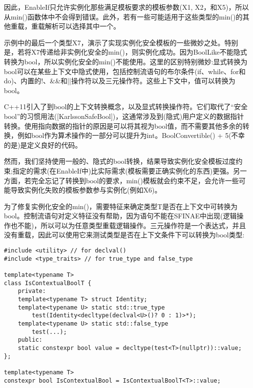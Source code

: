 因此，EnableIf只允许实例化那些满足模板要求的模板参数(X1, X2，和X5)，所以从min()函数体中不会得到错误。此外，若有一些可能适用于这些类型的min()的其他重载，重载解析可以选择其中一个。

示例中的最后一个类型X7，演示了实现实例化安全模板的一些微妙之处。特别是，若将X7传递给非实例化安全的min()，则实例化成功。因为BoolLike不能隐式转换为bool，所以实例化安全的min()不能使用。这里的区别特别微妙:显式转换为bool可以在某些上下文中隐式使用，包括控制流语句的布尔条件(if、while、for和do)、内置的!、\&\&和||操作符以及三元操作符。这些上下文中，值可以转换为bool。

\begin{tcolorbox}[colback=webgreen!5!white,colframe=webgreen!75!black]
\hspace*{0.75cm}C++11引入了到bool的上下文转换概念，以及显式转换操作符。它们取代了“安全bool”的习惯用法([KarlssonSafeBool])，这通常涉及到(隐式)用户定义的数据指针转换。使用指向数据的指针的原因是可以将其视为bool值，而不需要其他多余的转换，例如bool作为算术操作的一部分可以提升为int。BoolConvertible() + 5(不幸的是)是定义良好的代码。
\end{tcolorbox}

然而，我们坚持使用一般的、隐式的bool转换，结果导致实例化安全模板过度约束;指定的需求(在EnableIf中)比实际需求(模板需要正确实例化的东西)更强。另一方面，若完全忘记了转换到bool的要求，min()模板就会约束不足，会允许一些可能导致实例化失败的模板参数参与实例化(例如X6)。

为了修复实例化安全的min()，需要特征来确定类型T是否在上下文中可转换为bool。控制流语句对定义特征没有帮助，因为语句不能在SFINAE中出现(逻辑操作也不能)，所以可以为任意类型重载逻辑操作。三元操作符是一个表达式，并且没有重载，因此可以使用它来测试类型是否在上下文条件下可以转换为bool类型:

\begin{lstlisting}[style=styleCXX]
#include <utility> // for declval()
#include <type_traits> // for true_type and false_type

template<typename T>
class IsContextualBoolT {
	private:
	template<typename T> struct Identity;
	template<typename U> static std::true_type
		test(Identity<decltype(declval<U>()? 0 : 1)>*);
	template<typename U> static std::false_type
		test(...);
	public:
	static constexpr bool value = decltype(test<T>(nullptr))::value;
};

template<typename T>
constexpr bool IsContextualBool = IsContextualBoolT<T>::value;
\end{lstlisting}

